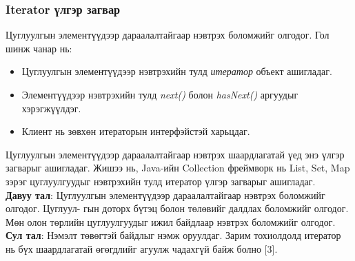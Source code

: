
\subsubsection{Iterator үлгэр загвар}
\quad \quad Цуглуулгын элементүүдээр дараалалтайгаар нэвтрэх боломжийг олгодог. Гол шинж чанар нь:
\begin{itemize}
	\item Цуглуулгын элементүүдээр нэвтрэхийн тулд \textit{итератор} объект ашигладаг.
	\item Элементүүдээр нэвтрэхийн тулд \textit{next()} болон \textit{hasNext()} аргуудыг хэрэгжүүлдэг.
	\item Клиент нь зөвхөн итераторын интерфэйстэй харьцдаг.
\end{itemize}
Цуглуулгын элементүүдээр дараалалтайгаар нэвтрэх шаардлагатай үед энэ үлгэр загварыг ашигладаг. Жишээ нь, Java-ийн Collection фреймворк нь List, Set, Map зэрэг цуглуулгуудыг нэвтрэхийн тулд итератор үлгэр загварыг ашигладаг.\\
\textbf{Давуу тал}: Цуглуулгын элементүүдээр дараалалтайгаар нэвтрэх боломжийг олгодог. Цуглуул- гын доторх бүтэц болон төлөвийг далдлах боломжийг олгодог. Мөн олон төрлийн цуглуулгуудыг ижил байдлаар нэвтрэх боломжийг олгодог.\\
\textbf{Сул тал}: Нэмэлт төвөгтэй байдлыг нэмж оруулдаг. Зарим тохиолдолд итератор нь бүх шаардлагатай өгөгдлийг агуулж чадахгүй байж болно [3].